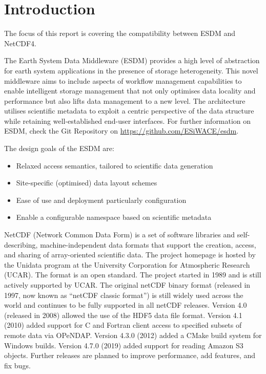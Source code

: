 \chapter{Introduction}
\label{ch:intro}

\tab
The focus of this report is covering the compatibility between ESDM and NetCDF4.

The Earth System Data Middleware (ESDM) provides a high level of abstraction for earth system applications in the presence of storage heterogeneity. This novel middleware aims to include aspects of workflow management capabilities to enable intelligent storage management that not only optimises data locality and performance but also lifts data management to a new level. The architecture utilises scientific metadata to exploit a centric perspective of the data structure while retaining well-established end-user interfaces. For further information on ESDM, check the Git Repository on \url{https://github.com/ESiWACE/esdm}.

The design goals of the ESDM are:

\begin{itemize}

\item Relaxed access semantics, tailored to scientific data generation

\item Site-specific (optimised) data layout schemes

\item Ease of use and deployment particularly configuration

\item Enable a configurable namespace based on scientific metadata

\end{itemize}

NetCDF (Network Common Data Form) is a set of software libraries and self-describing, machine-independent data formats that support the creation, access, and sharing of array-oriented scientific data. The project homepage is hosted by the Unidata program at the University Corporation for Atmospheric Research (UCAR). The format is an open standard. The project started in 1989 and is still actively supported by UCAR. The original netCDF binary format (released in 1997, now known as ``netCDF classic format'') is still widely used across the world and continues to be fully supported in all netCDF releases. Version 4.0 (released in 2008) allowed the use of the HDF5 data file format. Version 4.1 (2010) added support for C and Fortran client access to specified subsets of remote data via OPeNDAP. Version 4.3.0 (2012) added a CMake build system for Windows builds. Version 4.7.0 (2019) added support for reading Amazon S3 objects. Further releases are planned to improve performance, add features, and fix bugs.

